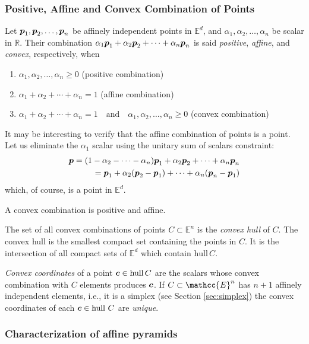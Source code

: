 \subsubsection*{Positive, Affine and Convex Combination of Points}
\label{par:AffineConvexCombination}

Let ${\mbox{\boldmath $p$}}_1, {\mbox{\boldmath $p$}}_2, \ldots, {\mbox{\boldmath $p$}}_n$ be affinely independent points in $\mathbb{E}^d$, and $\alpha_1, \alpha_2, \ldots, \alpha_n$ be scalar in $\mathbb{R}$. Their combination $\alpha_1 {\mbox{\boldmath $p$}}_1 + \alpha_2 {\mbox{\boldmath $p$}}_2 + \cdots + \alpha_n {\mbox{\boldmath $p$}}_n$ is said \emph{positive}, \emph{affine}, and \emph{convex}, respectively, when
\begin{enumerate}
\item $\alpha_1, \alpha_2, \ldots, \alpha_n \geq 0$ \hfill (positive combination)
\item $\alpha_1 + \alpha_2 + \cdots + \alpha_n = 1$ \hfill (affine combination)
\item $\alpha_1 + \alpha_2 + \cdots + \alpha_n = 1\quad\mbox{and}\quad \alpha_1, \alpha_2, \ldots, \alpha_n \geq 0$ \hfill (convex combination)
\end{enumerate}

It may be interesting to verify that the affine combination of points is a point.
Let us eliminate the $\alpha_1$ scalar using the unitary sum of scalars constraint:
\begin{eqnarray}
{\mbox{\boldmath $p$}} = (1 - \alpha_2 - \cdots - \alpha_n) {\mbox{\boldmath $p$}}_1 + \alpha_2 {\mbox{\boldmath $p$}}_2 + \cdots + \alpha_n {\mbox{\boldmath $p$}}_n\\
= {\mbox{\boldmath $p$}}_1 + \alpha_2 ({\mbox{\boldmath $p$}}_2-{\mbox{\boldmath $p$}}_1) + \cdots + \alpha_n ({\mbox{\boldmath $p$}}_n-{\mbox{\boldmath $p$}}_1)
\end{eqnarray}
which, of course, is a point in $\mathbb{E}^d$.

A convex combination is positive and affine.

The set of all convex combinations of points $C \subset \mathbb{E}^n$ is the \emph{convex hull} of $C$.  The convex hull is the smallest compact set containing the points in $C$.
It is the intersection of all compact sets of $\mathbb{E}^d$ which contain $\mbox{hull}\, C$. 

\emph{Convex coordinates} of a point ${\mbox{\boldmath $c$}} \in \mbox{hull}\, C$ are the scalars whose convex combination with $C$ elements produces ${\mbox{\boldmath $c$}}$. If $C\subset \mathcc{E}^n$ has $n+1$ affinely independent elements, i.e., it is a simplex (see Section \ref{sec:simplex}) the convex coordinates of each ${\mbox{\boldmath $c$}} \in \mbox{hull\ } C$ are \emph{unique}.


\subsubsection*{Characterization of affine pyramids}
\label{sec:ccccccc}

